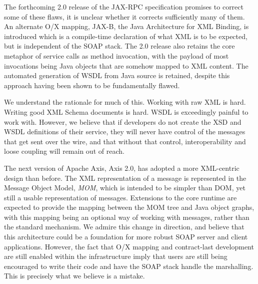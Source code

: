 The forthcoming 2.0 release of the JAX-RPC specification promises to
correct some of these flaws, it is unclear whether it corrects
sufficiently many of them. An alternate O/X mapping, JAX-B, the Java
Architecture for XML Binding, is introduced which is a compile-time
declaration of what XML is to be expected, but is independent of the
SOAP stack. The 2.0 release also retains the core metaphor of service
calls as method invocation, with the payload of most invocations
being Java objects that are somehow mapped to XML content. The
automated generation of WSDL from Java source is retained, despite
this approach having been shown to be fundamentally flawed.

We understand the rationale for much of this. Working with raw XML is
hard.  Writing good XML Schema documents is hard. WSDL is exceedingly
painful to work with. However, we believe that if developers do not
create the XSD and WSDL definitions of their service, they will never
have control of the messages that get sent over the wire, and that
without that control, interoperability and loose coupling will remain
out of reach.

The next version of Apache Axis, Axis 2.0, has adopted a more XML-centric design
than before. The XML representation of a message is represented in the Message
Object Model, \emph{MOM}, which is intended to be simpler than DOM, yet still a
usable representation of messages. Extensions to the core runtime are expected
to provide the mapping between the MOM tree and Java object graphs, with this
mapping being an optional way of working with messages, rather than the standard
mechanism. We admire this change in direction, and believe that this
architecture could be a foundation for more robust SOAP server and client
applications. However, the fact that O/X mapping and contract-last development
are still enabled within the infrastructure imply that users are still being
encouraged to write their code and have the SOAP stack handle the marshalling.
This is precisely what we believe is a mistake.

